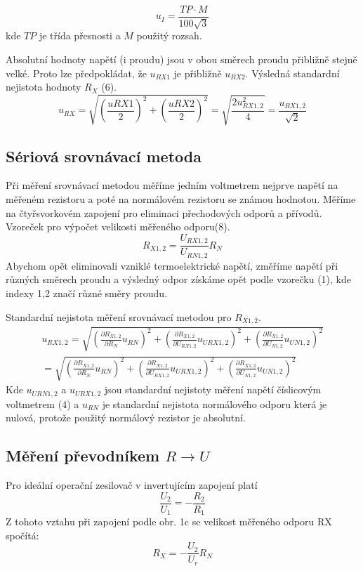 \documentclass{article}
\begin{document}
\begin{equation}
	u_I = \frac{TP \cdot M}{100\sqrt{3}}
\end{equation}
kde $TP$ je třída přesnosti a $M$ použitý rozsah.

Absolutní hodnoty napětí (i proudu) jsou v obou směrech proudu přibližně stejně velké. Proto lze předpokládat, že $u_{RX1}$ je přibližně $u_{RX2}$. Výsledná standardní nejistota hodnoty $R_X$ (6).
\begin{equation}
	u_{RX} = \sqrt{(\frac{u{RX1}}{2})^2+(\frac{u{RX2}}{2})^2}=\sqrt{\frac{2u_{RX1,2}^2}{4}}=\frac{u_{RX1,2}}{\sqrt{2}}
\end{equation}

\subsection{Sériová srovnávací metoda}
Při měření srovnávací metodou měříme jedním voltmetrem nejprve napětí na měřeném rezistoru a poté na normálovém rezistoru se známou hodnotou. Měříme na čtyřsvorkovém zapojení pro eliminaci přechodových odporů a přívodů. Vzoreček pro výpočet velikosti měřeného odporu(8).
\begin{equation}
	R_{X1,2}=\frac{U_{RX1,2}}{U_{RN1,2}}R_N
\end{equation}
Abychom opět eliminovali vzniklé termoelektrické napětí, změříme napětí při různých
směrech proudu a výsledný odpor získáme opět podle vzorečku (1), kde indexy 1,2 značí různé
směry proudu.

Standardní nejistota měření srovnávací metodou pro $R_{X1,2}$.
\begin{equation}
	\begin{multlined}
	u_{RX1,2}=\sqrt{(\frac{\partial R_{X1,2}}{\partial R_N}u_{RN})^2+(\frac{\partial R_{X1,2}}{\partial U_{RX1,2}}u_{URX1,2})^2+(\frac{\partial R_{X1,2}}{\partial U_{N1,2}}u_{UN1,2})^2}\\
	=\sqrt{(\frac{\partial R_{X1,2}}{\partial R_N}u_{RN})^2+(\frac{\partial R_{X1,2}}{\partial U_{RX1,2}}u_{URX1,2})^2+(\frac{\partial R_{X1,2}}{\partial U_{N1,2}}u_{UN1,2})^2}
\end{multlined}
\end{equation}
Kde $u_{URN1,2}$ a $u_{URX1,2}$ jsou standardní nejistoty měření napětí číslicovým voltmetrem (4) a $u_{RN}$ je standardní nejistota normálového odporu která je nulová, protože použitý normálový rezistor je absolutní.
\subsection{Měření převodníkem $R \to U$}
Pro ideální operační zesilovač v invertujícím zapojení platí
\begin{equation}
	\frac{U_2}{U_1}=-\frac{R_2}{R_1}
\end{equation}
Z tohoto vztahu při zapojení podle obr. 1c se velikost měřeného odporu RX spočítá:
\begin{equation}
	R_X = -\frac{U_2}{U_r}R_N
\end{equation}
\end{document}
